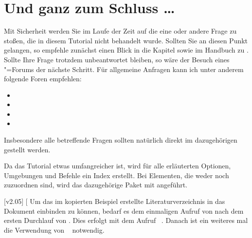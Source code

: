 \documentclass[%
  english,ngerman,%
  cdgeometry=no,DIV=12,automark,%
]{tudscrartcl}
\begin{document}
\section{Und ganz zum Schluss \dots}
Mit Sicherheit werden Sie im Laufe der Zeit auf die eine oder andere Frage zu 
 stoßen, die in diesem Tutorial nicht behandelt wurde. Sollten 
Sie an diesen Punkt gelangen, so empfehle zunächst einen Blick in die Kapitel 
sowie  im Handbuch zu 
\TUDScript. Sollte Ihre Frage trotzdem unbeantwortet bleiben, so wäre der 
Besuch eines "=Forums der nächste Schritt. Für allgemeine 
Anfragen kann ich unter anderem folgende Foren empfehlen:
%
\begin{itemize}
\item {}
\item {}
\item {}
\item {}
\end{itemize} 
%
Insbesondere alle \TUDScript betreffende Fragen sollten natürlich direkt im 
dazugehörigen \Forum gestellt werden.

\begin{Trunk+}
\printbibliography[heading=bibintoc]\label{sec:bibliography}%
\end{Trunk+}
\printbibliography[heading=bibintoc]

\begin{Preamble+}
\usepackage[colorlinks,linkcolor=blue]{hyperref}

\end{Preamble+}

Da das Tutorial etwas umfangreicher ist, wird für alle erläuterten Optionen, 
Umgebungen und Befehle ein Index erstellt. Bei Elementen, die weder \TUDScript 
noch \KOMAScript zuzuordnen sind, wird das dazugehörige Paket mit angeführt.
\PrintIndex

[v2.05]
\FinishTutorial[%
  Um das im kopierten Beispiel erstellte Literaturverzeichnis in das Dokument 
  einbinden zu können, bedarf es dem einmaligen Aufruf von  
  nach dem ersten Durchlauf von . Dies erfolgt mit dem Aufruf 
  ~. Danach ist ein weiteres mal die Verwendung 
  von ~ notwendig.
\end{document}
